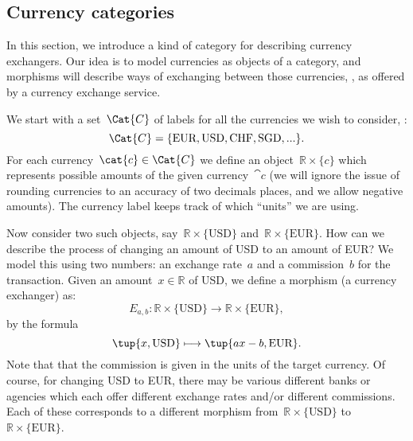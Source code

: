 \subsection{Currency categories}
\label{sec:currency_cat}
In this section, we introduce a kind of category for describing currency exchangers. Our idea is to model currencies as objects of a category, and morphisms will describe ways of exchanging between those currencies, , as offered by a currency exchange service. 

We start with a set~$\Cat{C}$ of labels for all the currencies we wish to consider, :
\begin{equation*}
    \Cat{C} = \{ \text{EUR}, \text{USD}, \text{CHF}, \text{SGD}, ... \}.
\end{equation*}
For each currency~$\cat{c} \in \Cat{C}$ we define an object~$\mathbb{R} \times \{c\}$ which represents possible amounts of the given currency~$\cat{c}$ (we will ignore the issue of rounding currencies to an accuracy of two decimals places, and we allow negative amounts). The currency label keeps track of which ``units'' we are using.

Now consider two such objects, say~$\mathbb{R} \times \{\text{USD}\}$ and~$\mathbb{R} \times \{\text{EUR}\}$. How can we describe the process of changing an amount of USD to an amount of EUR? We model this using two numbers: an exchange rate~$a$ and a commission~$b$ for the transaction. Given an amount~$x \in \mathbb{R}$ of USD, we define a morphism (a currency exchanger) as:
\begin{equation*}
E_{a,b} \colon \mathbb{R} \times \{\text{USD}\} \rightarrow \mathbb{R} \times \{\text{EUR}\},
\end{equation*}
by the formula
\begin{equation*}
\tup{x, \text{USD}} \longmapsto \tup{ax - b, \text{EUR}}. 
\end{equation*}
Note that that the commission is given in the units of the target currency. Of course, for changing USD to EUR, there may be various different banks or agencies which each offer different exchange rates and/or different commissions. Each of these corresponds to a different morphism from~$\mathbb{R} \times \{\text{USD}\}$ to~$\mathbb{R} \times \{\text{EUR}\}$.

